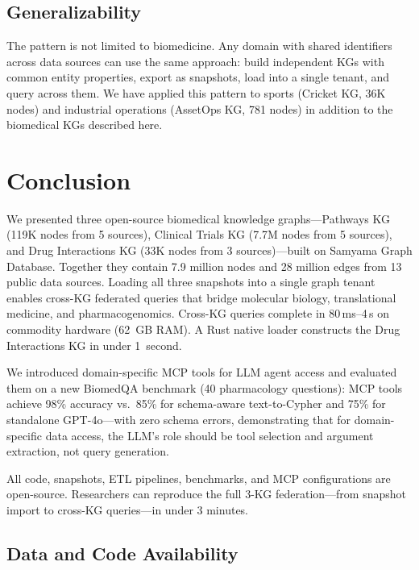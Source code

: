 \documentclass[11pt]{article}
\begin{document}
\subsection{Generalizability}

The pattern is not limited to biomedicine. Any domain with shared identifiers across data sources can use the same approach: build independent KGs with common entity properties, export as snapshots, load into a single tenant, and query across them. We have applied this pattern to sports (Cricket KG, 36K nodes) and industrial operations (AssetOps KG, 781 nodes) in addition to the biomedical KGs described here.

\section{Conclusion}

We presented three open-source biomedical knowledge graphs---Pathways KG (119K nodes from 5 sources), Clinical Trials KG (7.7M nodes from 5 sources), and Drug Interactions KG (33K nodes from 3 sources)---built on Samyama Graph Database. Together they contain 7.9 million nodes and 28 million edges from 13 public data sources. Loading all three snapshots into a single graph tenant enables cross-KG federated queries that bridge molecular biology, translational medicine, and pharmacogenomics. Cross-KG queries complete in 80\,ms--4\,s on commodity hardware (62~GB RAM). A Rust native loader constructs the Drug Interactions KG in under 1~second.

We introduced domain-specific MCP tools for LLM agent access and evaluated them on a new BiomedQA benchmark (40 pharmacology questions): MCP tools achieve 98\% accuracy vs.\ 85\% for schema-aware text-to-Cypher and 75\% for standalone GPT-4o---with zero schema errors, demonstrating that for domain-specific data access, the LLM's role should be tool selection and argument extraction, not query generation.

All code, snapshots, ETL pipelines, benchmarks, and MCP configurations are open-source. Researchers can reproduce the full 3-KG federation---from snapshot import to cross-KG queries---in under 3 minutes.

\subsection*{Data and Code Availability}
\end{document}

